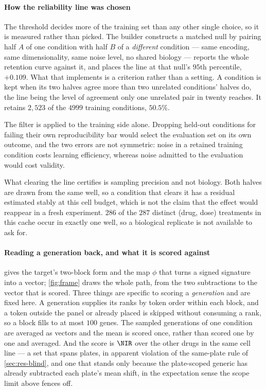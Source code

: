   \paragraph{How the reliability line was chosen} The threshold decides more of the
training set than any other single choice, so it is measured rather than picked.
The builder constructs a matched null by pairing half $A$ of one condition with
half $B$ of a \emph{different} condition --- same encoding, same dimensionality,
same noise level, no shared biology --- reports the whole retention curve against
it, and places the line at that null's $95$th percentile, $+0.109$. What that implements is a criterion
rather than a setting. A condition is kept when its two halves agree more than two
unrelated conditions' halves do, the line being the level of agreement only one
unrelated pair in twenty reaches. It retains $2{,}523$ of the $\num{4999}$
training conditions, $50.5\%$.

The filter is applied to the training side alone. Dropping held-out conditions for
failing their own reproducibility bar would select the evaluation set on its own
outcome, and the two errors are not symmetric: noise in a retained training
condition costs learning efficiency, whereas noise admitted to the evaluation
would cost validity.

What clearing the line certifies is sampling precision and not biology. Both
halves are drawn from the same well, so a condition that clears it has a residual
estimated stably at this cell budget, which is not the claim that the effect would
reappear in a fresh experiment. $\num{286}$ of the $\num{287}$ distinct (drug,
dose) treatments in this cache occur in exactly one well, so a biological
replicate is not available to ask for.

  \paragraph{Reading a generation back, and what it is scored against}
   gives the target's two-block form and the map $\phi$
  that turns a signed signature into a vector; \cref{fig:frame} draws the whole path,
  from the two subtractions to the vector that is scored. Three things are specific to
  scoring a \emph{generation} and are fixed here. A generation supplies its ranks by
  token order within each block, and a token outside the panel or already placed is
  skipped without consuming a rank, so a block fills to at most $100$ genes. The
  sampled generations of one condition are averaged as vectors and the mean is scored
  once, rather than scored one by one and averaged. And the score is $\NIR$ over the
  other drugs in the same cell line --- a set that spans plates, in apparent violation
  of the same-plate rule of \cref{sec:res-blind}, and one that stands only because the
  plate-scoped generic has already subtracted each plate's mean shift, in the
  expectation sense the scope limit above fences off.
  

